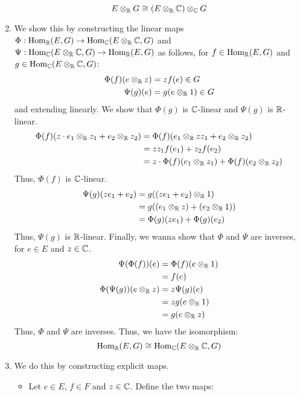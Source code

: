 \documentclass[12pt]{article}
\begin{document}
\begin{solu}
\begin{enumerate}
        \[E \otimes_\mathbb R G \cong (E \otimes_\mathbb R \mathbb C) \otimes_\mathbb C G\]
        \item We show this by constructing the linear maps $\Phi: \operatorname{Hom}_\mathbb R(E, G) \to \operatorname{Hom}_\mathbb C(E \otimes_\mathbb R \mathbb C, G)$ and $\Psi: \operatorname{Hom}_\mathbb C(E \otimes_\mathbb R \mathbb C, G) \to \operatorname{Hom}_\mathbb R(E, G)$ as follows, for $f \in \operatorname{Hom}_\mathbb R(E, G)$ and $g \in \operatorname{Hom}_\mathbb C(E \otimes_\mathbb R \mathbb C, G)$:
        \begin{align*}
            \Phi(f)(e \otimes_\mathbb R z) &= zf(e) \in G \\
            \Psi(g)(e) &= g(e \otimes_\mathbb R 1) \in G
        \end{align*}
        and extending linearly. We show that $\Phi(g)$ is $\mathbb C$-linear and $\Psi(g)$ is $\mathbb R$-linear. 
        \begin{align*}
            \Phi(f)(z \cdot e_1 \otimes_\mathbb R z_1 + e_2 \otimes_\mathbb R z_2) &= \Phi(f)(e_1 \otimes_\mathbb R zz_1 + e_2 \otimes_\mathbb R z_2) \\
            &= zz_1f(e_1) + z_2f(e_2) \\
            &= z\cdot \Phi(f)(e_1 \otimes_\mathbb R z_1)  + \Phi(f)(e_2 \otimes_\mathbb R z_2)
        \end{align*}
        Thus, $\Phi(f)$ is $\mathbb C$-linear.
        \begin{align*}
            \Psi(g)(ze_1 + e_2) &= g((ze_1+e_2) \otimes_\mathbb R 1) \\
            &= g((e_1 \otimes_\mathbb R z) + (e_2 \otimes_\mathbb R 1)) \\
            &= \Phi(g)(ze_1) + \Phi(g)(e_2)
        \end{align*}
        Thus, $\Psi(g)$ is $\mathbb R$-linear. Finally, we wanna show that $\Phi$ and $\Psi$ are inverses, for $e\in E$ and $z \in \mathbb C$. 
        \begin{align*}
            \Psi(\Phi(f))(e) &= \Phi(f)(e \otimes_\mathbb R 1) \\
            &= f(e) \\
            \Phi(\Psi(g))(e \otimes_\mathbb R z) &= z\Psi(g)(e) \\
            &= zg(e \otimes_\mathbb R 1) \\
            &= g(e \otimes_\mathbb R z)
        \end{align*}
        Thus, $\Phi$ and $\Psi$ are inverses. Thus, we have the isomorphism:
        \[\operatorname{Hom}_\mathbb R(E, G) \cong \operatorname{Hom}_\mathbb C(E \otimes_\mathbb R \mathbb C, G)\]
        \item We do this by constructing explicit maps. 
        \begin{itemize}
            \item Let $e \in E$, $f\in F$ and $z \in \mathbb C$. Define the two maps: 

\end{itemize}
\end{enumerate}
\end{solu}
\end{document}
